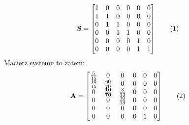 \documentclass[12pt]{book}
\theoremstyle{plain}
\newcommand\addtag{\refstepcounter{equation}
\renewcommand{\labelenumii}{\theenumii}
\renewcommand{\theenumii}{\theenumi.\arabic{enumii}.}
\tag{\theequation}}
\begin{document}
\def \AcaseZero {\begin{bmatrix}
		\frac{5}{15}  & 0             & 0             & 0 & 0 & 0 \\
		\frac{10}{15} & \frac{60}{70} & 0             & 0 & 0 & 0 \\
		0          	  & \frac{10}{70} & \frac{3}{13}  & 0 & 0 & 0 \\
		0             & 0             & \frac{10}{13} & 0 & 0 & 0 \\
		0             & 0             & 0             & 0 & 0 & 0 \\
		0             & 0             & 0             & 0 & 1 & 0 
\end{bmatrix}}

\[\textbf{S}= \begin{bmatrix}
1 & 0 & 0 & 0 & 0 & 0 \\
1 & 1 & 0 & 0 & 0 & 0 \\
0 & \mathbf{1} & 1 & 0 & 0 & 0 \\
0 & 0 & 1 & 1 & 0 & 0 \\
0 & 0 & 0 & 0 & 1 & 0 \\
0 & 0 & 0 & 0 & 1 & 1 
\end{bmatrix} \addtag \]
Macierz systemu to zatem:
\[\textbf{A}= \begin{bmatrix}
\frac{5}{15}  & 0             & 0             & 0 & 0 & 0 \\
\frac{10}{15} & \frac{60}{70} & 0             & 0 & 0 & 0 \\
0          	  & \mathbf{\frac{10}{70}} & \frac{3}{13}  & 0 & 0 & 0 \\
0             & 0             & \frac{10}{13} & 0 & 0 & 0 \\
0             & 0             & 0             & 0 & 0 & 0 \\
0             & 0             & 0             & 0 & 1 & 0 
\end{bmatrix} \addtag \]
\def \utMinusI{\begin{bmatrix} 
		7 \\ 0 \\ 0 \\ 0 \\ 0 \\ 0 
\end{bmatrix}}
\def \xtMinusI{\begin{bmatrix} 
		15 \\ 70 \\ 13 \\ 7 \\ 5 \\ 18	
\end{bmatrix}}
\end{document}
